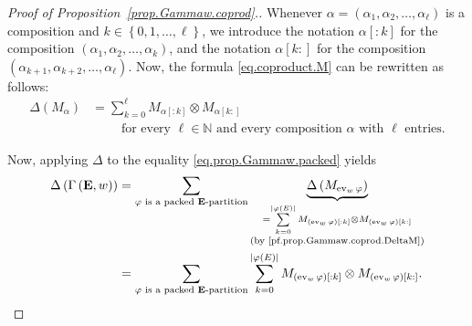 \documentclass[12pt]{article}
\theoremstyle{plain}
\theoremstyle{definition}
\theoremstyle{remark}
\let\sumnonlimits\sum
\renewcommand{\sum}{\sumnonlimits\limits}
\newcommand{\ev}{\operatorname{ev}}
\newcommand{\EE}{{\mathbf{E}}}
\newcommand{\NN}{{\mathbb{N}}}
\begin{document}
\begin{proof}[Proof of Proposition~\ref{prop.Gammaw.coprod}.]
Whenever
$\alpha = \left(\alpha_1, \alpha_2, \ldots, \alpha_\ell\right)$
is a composition and $k \in \left\{0, 1, \ldots, \ell\right\}$,
we introduce the notation
$\alpha\left[:k\right]$ for the composition
$\left(\alpha_1, \alpha_2, \ldots, \alpha_k\right)$, and the
notation $\alpha\left[k:\right]$ for the composition
$\left(\alpha_{k+1}, \alpha_{k+2}, \ldots, \alpha_\ell\right)$.
Now, the formula \eqref{eq.coproduct.M} can be rewritten as
follows:
\begin{align}
\label{pf.prop.Gammaw.coprod.DeltaM}
\Delta \left( M_\alpha \right)
&= \sum_{k=0}^{\ell} M_{\alpha\left[:k\right]}
\otimes M_{\alpha\left[k:\right]} \\
& \qquad \text{ for every } \ell \in \NN \text{ and every composition } \alpha
\text{ with } \ell \text{ entries.} \nonumber
\end{align}

Now, applying $\Delta$ to the equality
\eqref{eq.prop.Gammaw.packed} yields
\begin{align}
\Delta\left(\Gamma\left(\EE , w\right)\right)
&= \sum_{\varphi \text{ is a packed } \EE\text{-partition}}
\underbrace{\Delta\left(M_{\ev_w \varphi}\right)}_{
  \substack{ = \sum_{k=0}^{\left|\varphi\left(E\right)\right|}
  M_{\left(\ev_w \varphi\right)\left[:k\right]} \otimes
  M_{\left(\ev_w \varphi\right)\left[k:\right]} \\
  \text{(by \eqref{pf.prop.Gammaw.coprod.DeltaM})} }}
 \nonumber \\
&= \sum_{\varphi \text{ is a packed } \EE\text{-partition}}
\sum_{k=0}^{\left|\varphi\left(E\right)\right|}
M_{\left(\ev_w \varphi\right)\left[:k\right]} \otimes
M_{\left(\ev_w \varphi\right)\left[k:\right]} .
\label{pf.Gammaw.coprod.lhs}
\end{align}


\end{proof}
\end{document}
